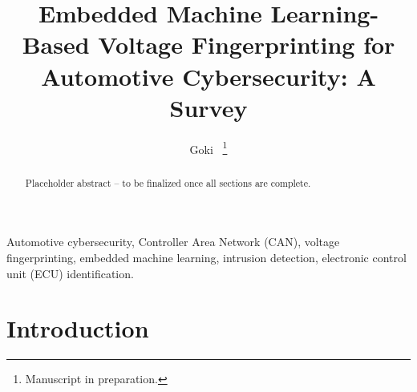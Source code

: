 \documentclass[journal]{IEEEtran}
\begin{document}
	
	\title{Embedded Machine Learning-Based Voltage Fingerprinting for Automotive Cybersecurity: A Survey}
	
	\author{Goki~%
		\thanks{Manuscript in preparation.}}
	
	
	\maketitle
	
	\begin{abstract}
		Placeholder abstract -- to be finalized once all sections are complete.
	\end{abstract}
	
	\begin{IEEEkeywords}
		Automotive cybersecurity, Controller Area Network (CAN), voltage
		fingerprinting, embedded machine learning, intrusion detection,
		electronic control unit (ECU) identification.
	\end{IEEEkeywords}
	
	\section{Introduction}
	
\end{document}
